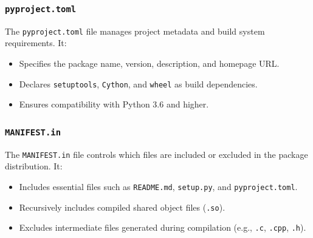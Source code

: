 \documentclass[a4paper,12pt]{article}
\begin{document}
\subsubsection{\texttt{pyproject.toml}}
The \texttt{pyproject.toml} file manages project metadata and build system requirements. It:
\begin{itemize}
    \item Specifies the package name, version, description, and homepage URL.
    \item Declares \texttt{setuptools}, \texttt{Cython}, and \texttt{wheel} as build dependencies.
    \item Ensures compatibility with Python 3.6 and higher.
\end{itemize}

\subsubsection{\texttt{MANIFEST.in}}
The \texttt{MANIFEST.in} file controls which files are included or excluded in the package distribution. It:
\begin{itemize}
    \item Includes essential files such as \texttt{README.md}, \texttt{setup.py}, and \texttt{pyproject.toml}.
    \item Recursively includes compiled shared object files (\texttt{.so}).
    \item Excludes intermediate files generated during compilation (e.g., \texttt{.c}, \texttt{.cpp}, \texttt{.h}).
\end{itemize}
\end{document}
